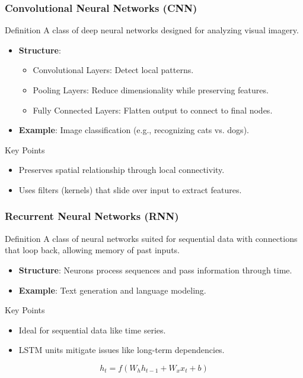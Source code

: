 \documentclass[aspectratio=169]{beamer}
\begin{document}
\begin{frame}[fragile]
    \frametitle{Convolutional Neural Networks (CNN)}
    \begin{block}{Definition}
        A class of deep neural networks designed for analyzing visual imagery.
    \end{block}
    \begin{itemize}
        \item \textbf{Structure}:
            \begin{itemize}
                \item Convolutional Layers: Detect local patterns.
                \item Pooling Layers: Reduce dimensionality while preserving features.
                \item Fully Connected Layers: Flatten output to connect to final nodes.
            \end{itemize}
        \item \textbf{Example}: Image classification (e.g., recognizing cats vs. dogs).
    \end{itemize}
    \begin{block}{Key Points}
        \begin{itemize}
            \item Preserves spatial relationship through local connectivity.
            \item Uses filters (kernels) that slide over input to extract features.
        \end{itemize}
    \end{block}
\end{frame}

\begin{frame}[fragile]
    \frametitle{Recurrent Neural Networks (RNN)}
    \begin{block}{Definition}
        A class of neural networks suited for sequential data with connections that loop back, allowing memory of past inputs.
    \end{block}
    \begin{itemize}
        \item \textbf{Structure}: Neurons process sequences and pass information through time.
        \item \textbf{Example}: Text generation and language modeling.
    \end{itemize}
    \begin{block}{Key Points}
        \begin{itemize}
            \item Ideal for sequential data like time series.
            \item LSTM units mitigate issues like long-term dependencies.
        \end{itemize}
    \end{block}
    \begin{equation}
        h_t = f(W_h h_{t-1} + W_x x_t + b)
    \end{equation}
\end{frame}
\end{document}
